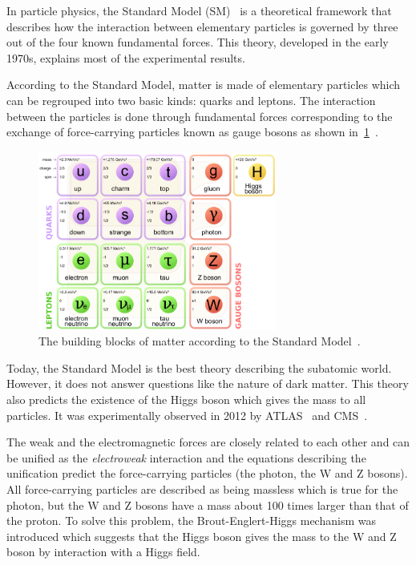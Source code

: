 In particle physics, the Standard Model
(SM)~\cite{Glashow:1961tr,Weinberg:1967tq,salam,tHooft:1972tcz} is a
theoretical framework that describes how the interaction between
elementary particles is governed by three out of the four known
fundamental forces. This theory, developed in the early 1970s,
explains most of the experimental results.

According to the Standard Model, matter is made of elementary
particles which can be regrouped into two basic kinds: quarks and
leptons. The interaction between the particles is done through
fundamental forces corresponding to the exchange of force-carrying
particles known as gauge bosons as shown
in~\cref{fig:standardmodel}~\cite{Thomson:1529540}.

\begin{figure}[htbp]
  \centering
  \includegraphics[width=0.7\textwidth]{figures/CLIC/StandardModel.png}
  \caption{The building blocks of matter according to the Standard
    Model~\cite{wikipediaParticles}.}
  \label{fig:standardmodel}
\end{figure}

Today, the Standard Model is the best theory describing the subatomic
world. However, it does not answer questions like the nature of dark
matter. This theory also predicts the existence of the Higgs boson
which gives the mass to all particles. It was experimentally observed
in 2012 by ATLAS~\cite{Aad20121} and CMS~\cite{Chatrchyan201230}.

The weak and the electromagnetic forces are closely related to each
other and can be unified as the \textit{electroweak} interaction and
the equations describing the unification predict the force-carrying
particles (the photon, the W and Z bosons). All force-carrying
particles are described as being massless which is true for the
photon, but the W and Z bosons have a mass about 100 times larger than
that of the proton. To solve this problem, the Brout-Englert-Higgs
mechanism was introduced which suggests that the Higgs boson gives the
mass to the W and Z boson by interaction with a Higgs field.

